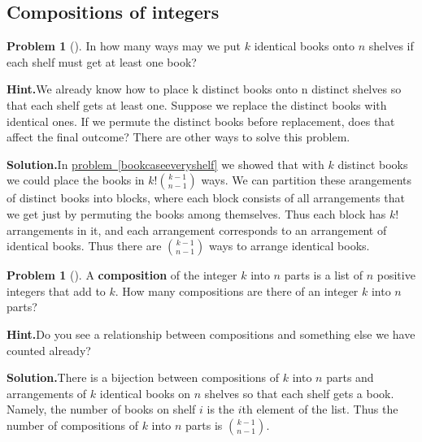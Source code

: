 \documentclass[10pt,]{book}
\newcommand{\terminology}[1]{\textbf{#1}}
\theoremstyle{plain}
\theoremstyle{definition}
\newtheorem{activity}[project]{Problem}
\theoremstyle{definition}
\numberwithin{equation}{chapter}
\begin{document}
\subsection[{Compositions of integers}]{Compositions of integers}\label{subsection-25}
\begin{activity}[]\label{activity-129}
In how many ways may we put \(k\) identical books onto \(n\) shelves if each shelf must get at least one book?%
\par\medskip\noindent%
\textbf{Hint.}\quad We already know how to place k distinct books onto n distinct shelves so that each shelf gets at least one. Suppose we replace the distinct books with identical ones. If we permute the distinct books before replacement, does that affect the final outcome? There are other ways to solve this problem.%
\par\medskip\noindent%
\textbf{Solution.}\quad In \hyperref[bookcaseeveryshelf]{problem~\ref{bookcaseeveryshelf}} we showed that with \(k\) distinct books we could place the books in \(k!\binom{k-1}{n-1}\) ways. We can partition these arangements of distinct books into blocks, where each block consists of all arrangements that we get just by permuting the books among themselves. Thus each block has \(k!\) arrangements in it, and each arrangement corresponds to an arrangement of identical books. Thus there are \(\binom{k-1}{n-1}\) ways to arrange identical books.%
\end{activity}
\begin{activity}[]\label{compositionagian}
A \terminology{composition} of the integer \(k\) into \(n\) parts is a list of \(n\) positive integers that add to \(k\).  How many compositions are there of an integer \(k\) into \(n\) parts?%
\par\medskip\noindent%
\textbf{Hint.}\quad Do you see a relationship between compositions and something else we have counted already?%
\par\medskip\noindent%
\textbf{Solution.}\quad There is a bijection between compositions of \(k\) into \(n\) parts and arrangements of \(k\) identical books on \(n\) shelves so that each shelf gets a book. Namely, the number of books on shelf \(i\) is the \(i\)th element of the list. Thus the number of compositions of \(k\) into \(n\) parts is \(\binom{k-1}{n-1}\).%
\end{activity}
\end{document}
